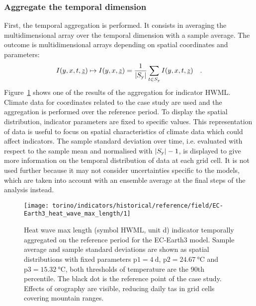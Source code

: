 \subsubsection{Aggregate the temporal dimension}
First, the temporal aggregation is performed. It consists in averaging the multidimensional array over the temporal dimension with a sample average. The outcome is multidimensional arrays depending on spatial coordinates and parameters:
\begin{equation}
  \label{eq:temporal_aggregation}
  I(y, x, t, \underline{z}) \mapsto I(y, x, \underline{z}) = \frac{1}{\lvert S_\text{y}\rvert} \sum_{t \in S_\text{y}} I(y, x, t, \underline{z})
  \quad .
\end{equation}
Figure~\ref{fig:historical_reference_field_EC-Earth3_heat_wave_max_length} shows one of the results of the aggregation for \gls{indicator} $\mathrm{HWML}$. Climate data for coordinates related to the case study are used and the aggregation is performed over the reference period. To display the spatial distribution, indicator parameters are fixed to specific values. This representation of data is useful to focus on spatial characteristics of climate data which could affect indicators. The sample standard deviation over time, i.e. evaluated with respect to the sample mean and normalised with $\lvert S_\text{y}\rvert - 1$, is displayed to give more information on the temporal distribution of data at each grid cell. It is not used further because it may not consider uncertainties specific to the models, which are taken into account with an ensemble average at the final steps of the analysis instead.

\begin{figure}
  \centering
  \texttt{[image: torino/indicators/historical/reference/field/EC-Earth3\_heat\_wave\_max\_length/1]}
  \caption{{Heat wave max length} (symbol $\mathrm{HWML}$, unit \unit{\day}) indicator temporally aggregated on the reference period for the EC-Earth3 model. Sample average and sample standard deviations are shown as spatial distributions with fixed parameters $\mathrm{p1} = \qty{4}{\day}$, $\mathrm{p2} = \qty{24.67}{\degreeCelsius}$ and $\mathrm{p3} = \qty{15.32}{\degreeCelsius}$, both thresholds of temperature are the 90th percentile. The black dot is the reference point of the case study. Effects of orography are visible, reducing daily \gls{tas} in grid cells covering mountain ranges.}
  \label{fig:historical_reference_field_EC-Earth3_heat_wave_max_length}
\end{figure}

